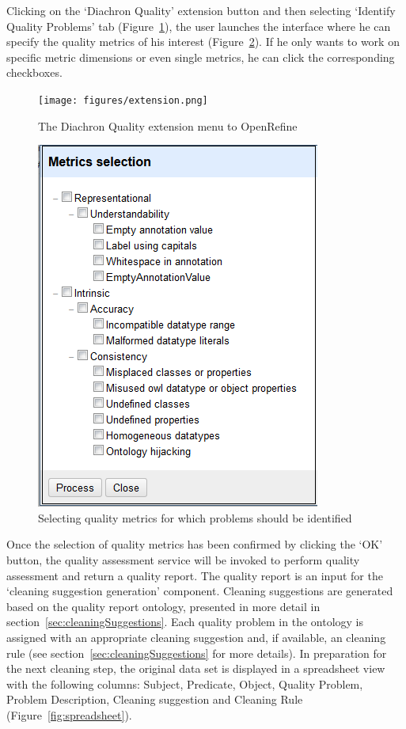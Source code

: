 Clicking on the `Diachron Quality' extension button and then selecting `Identify Quality Problems' tab  (Figure~\ref{fig:tab}), the user launches the interface where he can specify  the quality metrics of his interest (Figure~\ref{fig:interface}). If he only wants to work on specific metric  dimensions or even single metrics, he can click the corresponding checkboxes. 
\begin{figure}[ht!]
\centering
\texttt{[image: figures/extension.png]}
\caption{The Diachron Quality extension  menu to OpenRefine}
\label{fig:tab}
\end{figure}
\begin{figure}[ht!]
\centering
\includegraphics[width=.75\textwidth]{figures/metricSelection.png}
\caption{Selecting quality metrics for which problems should be identified}
\label{fig:interface}
\end{figure}

Once the selection of quality metrics has been confirmed by clicking the `OK' button, the quality assessment service will be invoked to perform quality assessment and return a quality report.
The quality report is an input for the `cleaning suggestion generation' component.
Cleaning suggestions are generated based on the quality report ontology, presented in more detail in section~\ref{sec:cleaningSuggestions}. Each quality problem in the ontology is assigned with an appropriate cleaning suggestion and, if available, an cleaning rule (see section~\ref{sec:cleaningSuggestions} for more details). 
In preparation for the next cleaning step, the original data set is displayed in a spreadsheet view with the following columns: Subject, Predicate, Object, Quality Problem, Problem Description, Cleaning suggestion and Cleaning Rule (Figure~\ref{fig:spreadsheet}).

